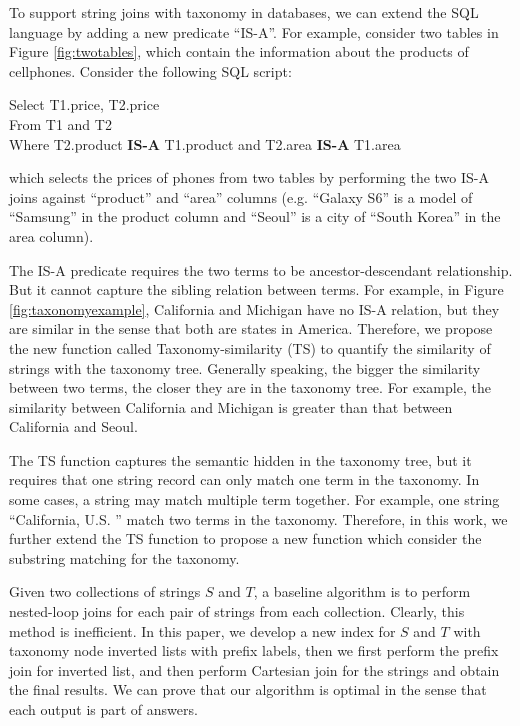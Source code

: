 


To support string joins with taxonomy in databases, we can extend the SQL language by adding a new predicate ``IS-A''. For example,
consider two tables in Figure \ref{fig:twotables}, which contain the information about the products of cellphones.  Consider the following SQL script:

\vspace{2mm}

\noindent \textsf{Select T1.price, T2.price} \\
\noindent \textsf{ From T1 and T2} \\
\noindent   \textsf{Where T2.product \textbf{IS-A} T1.product and T2.area \textbf{IS-A} T1.area}

 \vspace{2mm}


\noindent which selects the prices of phones from two tables by performing the two IS-A joins against ``\textsf{product}'' and ``\textsf{area}'' columns (e.g. ``\textsf{Galaxy S6}'' is a model of ``\textsf{Samsung}'' in the product column and ``\textsf{Seoul}'' is a city of ``\textsf{South Korea}'' in the area column).


The IS-A predicate requires the two terms to be ancestor-descendant relationship. But it cannot capture the sibling relation between terms. For example, in Figure \ref{fig:taxonomyexample}, California and Michigan have no IS-A relation, but they are similar in the sense that both are states in America. Therefore, we propose the new function called Taxonomy-similarity (TS) to quantify the similarity of strings with the taxonomy tree. Generally speaking,  the bigger the similarity between two terms, the closer they are in the taxonomy tree.  For example, the similarity between California and Michigan is greater than that between California and Seoul.


The TS function captures the semantic hidden in the taxonomy tree, but it requires that one string record can only match one term in the taxonomy. In some cases, a string may match multiple term together. For example, one string ``California, U.S. '' match two terms in the taxonomy. Therefore, in this work, we further extend the TS function to propose a new function which consider the substring matching for the taxonomy.

 Given two collections of strings $S$ and $T$, a baseline algorithm is to perform nested-loop joins for each pair of strings from each collection. Clearly, this method is inefficient. In this paper, we develop a new index for $S$ and $T$ with taxonomy node inverted lists with prefix labels, then we first perform the prefix join for inverted list, and then perform Cartesian join for the strings and obtain the final results. We can prove that our algorithm is optimal in the sense that each output is part of answers.



